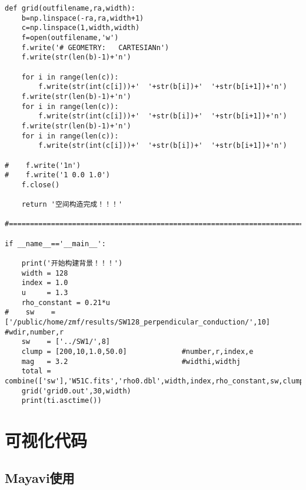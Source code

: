 \begin{lstlisting}
def grid(outfilename,ra,width):
    b=np.linspace(-ra,ra,width+1)
    c=np.linspace(1,width,width)
    f=open(outfilename,'w')
    f.write('# GEOMETRY:   CARTESIANn')
    f.write(str(len(b)-1)+'n')

    for i in range(len(c)):
        f.write(str(int(c[i]))+'  '+str(b[i])+'  '+str(b[i+1])+'n')
    f.write(str(len(b)-1)+'n')
    for i in range(len(c)):
        f.write(str(int(c[i]))+'  '+str(b[i])+'  '+str(b[i+1])+'n')
    f.write(str(len(b)-1)+'n')
    for i in range(len(c)):
        f.write(str(int(c[i]))+'  '+str(b[i])+'  '+str(b[i+1])+'n')

#    f.write('1n')
#    f.write('1 0.0 1.0')
    f.close()

    return '空间构造完成！！！'

#========================================================================

if __name__=='__main__':

    print('开始构建背景！！！')
    width = 128
    index = 1.0
    u     = 1.3
    rho_constant = 0.21*u
#    sw    = ['/public/home/zmf/results/SW128_perpendicular_conduction/',10]    #wdir,number,r
    sw    = ['../SW1/',8]
    clump = [200,10,1.0,50.0]             #number,r,index,e
    mag   = 3.2                           #widthi,widthj
    total = combine(['sw'],'W51C.fits','rho0.dbl',width,index,rho_constant,sw,clump,mag)
    grid('grid0.out',30,width)
    print(ti.asctime())

  \end{lstlisting}



\chapter{可视化代码}
\label{Further}

\section{Mayavi使用}
\label{Mayavi}

